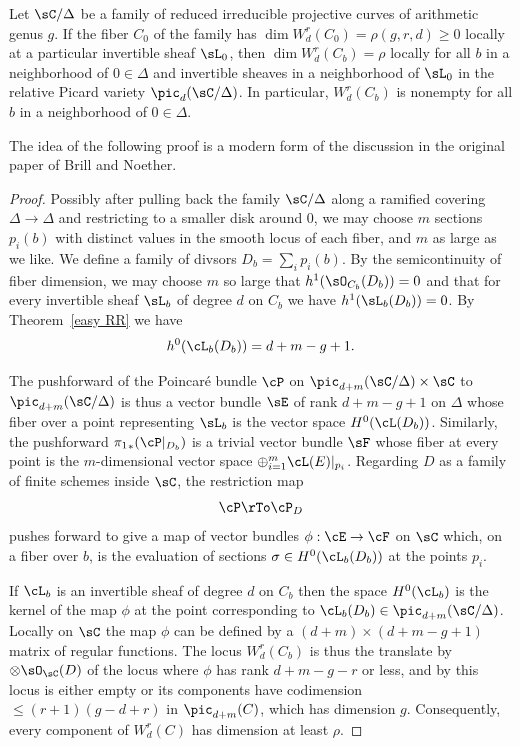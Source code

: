 \begin{theorem}\label{local existence}
Let $\sC/\Delta$ be a family of reduced irreducible projective curves of arithmetic genus $g$. If
the fiber  $C_0$ of the family has $\dim W^r_d(C_0) = \rho(g,r,d) \geq 0$
locally at a particular invertible sheaf $\sL_{0}$,  then $\dim W^r_d(C_b) = \rho$ locally for all $b$ in a neighborhood of $0 \in \Delta$ and invertible sheaves in a neighborhood of $\sL_{0}$
in the relative Picard variety $\pic_{d}(\sC/\Delta)$. In particular, $W^r_d(C_b)$ is nonempty for all $b$ in a neighborhood of $0 \in \Delta$.
\end{theorem}

The idea of the following proof is a modern form of the discussion in the original paper of Brill and Noether. 

\begin{proof}  Possibly after pulling back the family $\sC/\Delta$ along a ramified covering $\Delta\to \Delta$
and restricting to a smaller disk around 0, we may choose $m$ sections
$p_{i}(b)$ with distinct values in the smooth locus of each fiber, and $m$ as large as we like. We 
define a family of divsors $D_{b} = \sum_{i}p_{i}(b)$.
By the semicontinuity of fiber dimension, we may choose $m$ so large that $h^{1}(\sO_{C_{b}}(D_{b})) = 0$
and that for every invertible sheaf $\sL_{b}$ of degree $d$ on $C_{b}$ we have
$h^{1}(\sL_{b}(D_{b})) = 0$. 
By Theorem~\ref{easy RR} we have
$$
h^0(\cL_{b}(D_{b})) =  d+m - g + 1.
$$

The pushforward of the Poincar\'e bundle $\cP$ on $\pic_{d+m}(\sC/\Delta) \times \sC$ to $\pic_{d+m}(\sC/\Delta)$ is thus a vector
bundle $\sE$ of rank $d + m - g + 1$ on $\Delta$ whose fiber over a point representing $\sL_{b}$ is the vector space $H^0(\cL(D_{b}))$. Similarly,
the pushforward 
${\pi_1}_*(\cP|_{D_{b}})$
is a trivial vector bundle $\sF$ whose fiber at every point is the $m$-dimensional vector space $\oplus_{i = 1}^{m} \cL(E)|_{p_i}$. Regarding $D$ as a family of finite schemes inside $\sC$, the restriction map
$$
\cP  \rTo \cP_{D}
$$
pushes forward to give a map of vector bundles $\phi : \cE \to \cF$ on $\sC$ which, on a fiber over $b$, is the evaluation of sections $\sigma \in H^0(\cL_{b}(D_{b}))$ at the points $p_i$.

If $\cL_{b}$ is an invertible sheaf of degree $d$ on $C_{b}$ then the space $H^0(\cL_{b})$ is the kernel of the map $\phi$ at the point corresponding to $\cL_{b}(D_{b}) \in \pic_{d+m}(\sC/\Delta)$. Locally on $\sC$ the map $\phi$ can be defined by a $(d+m) \times (d+m-g+1)$ matrix of regular functions. The locus $W^r_d(C_{b})$ is 
thus the translate
by $\otimes \sO_{\sC}(D)$ of the locus where $\phi$ has rank $d+m-g-r$ or less, and by \cite[Exercise 10.9]{Eisenbud1995} this locus is either empty or its components have codimension $\leq (r+1)(g-d+r)$ in $\pic_{d+m}(C)$, which has dimension $g$. Consequently, every component of $W^r_d(C)$ has dimension at least $\rho$. 
\end{proof}

